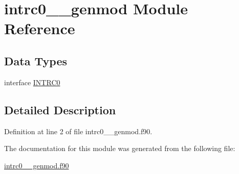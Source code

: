 \hypertarget{classintrc0____genmod}{\section{intrc0\+\_\+\+\_\+genmod Module Reference}
\label{classintrc0____genmod}
}
\subsection*{Data Types}
\begin{DoxyCompactItemize}
\item 
interface \hyperlink{interfaceintrc0____genmod_1_1INTRC0}{I\+N\+T\+R\+C0}
\end{DoxyCompactItemize}


\subsection{Detailed Description}


Definition at line 2 of file intrc0\+\_\+\+\_\+genmod.\+f90.



The documentation for this module was generated from the following file\+:\begin{DoxyCompactItemize}
\item 
\hyperlink{intrc0____genmod_8f90}{intrc0\+\_\+\+\_\+genmod.\+f90}\end{DoxyCompactItemize}
